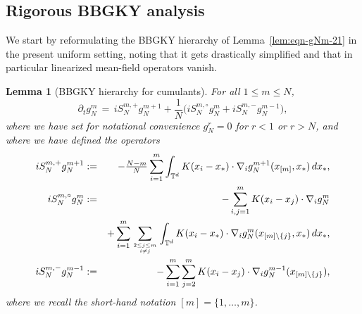 \documentclass[a4paper,11pt,reqno,noindent]{amsart}
\theoremstyle{plain}
\newtheorem{lem}{Lemma}[section]
\numberwithin{equation}{section}
\newcommand{\T}{\mathbb T}
\newcommand{\3}{|\!|\!|}
\begin{document}
\subsection{Rigorous BBGKY analysis}
We start by reformulating the BBGKY hierarchy of Lemma~\ref{lem:eqn-gNm-21} in the present uniform setting, noting that it gets drastically simplified and that in particular linearized mean-field operators vanish.

\begingroup\allowdisplaybreaks
\begin{lem}[BBGKY hierarchy for cumulants]\label{lem:eqn-gNm}
For all $1\le m\le N$,
\begin{equation}\label{eq:eqn-gNm}
\partial_tg_N^m
\,=\,iS_N^{m,+}g_N^{m+1}+\frac1N\Big(iS_N^{m,\circ}g_N^m+iS_N^{m,-}g_N^{m-1}\Big),
\end{equation}
where we have set for notational  convenience $g^r_N=0$ for $r<1$ or $r>N$, and where we have defined the operators
\begin{eqnarray*}
iS_N^{m,+}g_N^{m+1}&:=&-\tfrac{N-m}N\sum_{i=1}^m\int_{\T^d} K(x_i-x_*)\cdot\nabla_ig_N^{m+1}(x_{[m]},x_*)\,dx_*,\\
iS_N^{m,\circ}g_N^m&:=&-\sum_{i,j=1}^mK(x_i-x_j)\cdot\nabla_ig_N^m\\
&&+\sum_{i=1}^m\sum_{2\le j\le m\atop i\ne j}\int_{\T^d}K(x_i-x_*)\cdot\nabla_ig_N^{m}(x_{[m]\setminus\{j\}},x_*)\,dx_*,\\
iS_N^{m,-}g_N^{m-1}&:=&-\sum_{i=1}^m\sum_{j=2}^mK(x_i-x_j)\cdot\nabla_ig_N^{m-1}(x_{[m]\setminus\{j\}}),
\end{eqnarray*}
where we recall the short-hand notation $[m]=\{1,\ldots,m\}$.
\end{lem}
\end{document}
